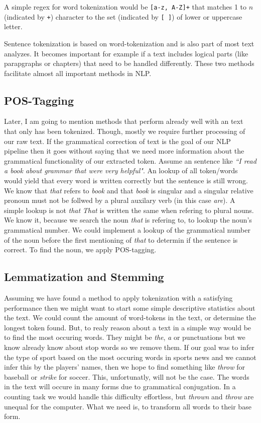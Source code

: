 A simple regex for word tokenization would be \texttt{[a-z, A-Z]+} that matches 1 to $n$ (indicated by \texttt{+}) character to the set (indicated by \texttt{[ ]}) of lower or uppercase letter.

Sentence tokenization is based on word-tokenization and is also part of most text analyzes. It becomes important for example if a text includes logical parts (like parapgraphs or chapters) that need to be handled differently.
These two methods facilitate almost all important methods in NLP.

\subsection{POS-Tagging}
Later, I am going to mention methods that perform already well with an text that only has been tokenized. Though, mostly we require further processing of our raw text. If the grammatical correction of text is the goal of our NLP pipeline then it goes without saying that we need more information about the grammatical functionality of our extracted token. Assume an sentence like \textit{``I read a book about grammar that were very helpful"}. An lookup of all token/words would yield that every word is written correctly but the sentence is still wrong. We know that \textit{that} refers to \textit{book} and that \textit{book} is singular and a singular relative pronoun must not be follwed by a plural auxilary verb (in this case \textit{are}). A simple lookup is not \textit{that} \textit{That} is written the same when refering to plural nouns. We know it, because we search the noun \textit{that} is refering to, to lookup the noun's grammatical number. We could implement a lookup of the grammatical number of the noun before the first mentioning of \textit{that} to determin if the sentence is correct. To find the noun, we apply POS-tagging.

\subsection{Lemmatization and Stemming}
Assuming we have found a method to apply tokenization with a satisfying performance then we might want to start some simple descriptive statistics about the text. We could count the amount of word-tokens in the text, or determine the longest token found. But, to realy reason about a text in a simple way would be to find the most occuring words. They might be \textit{the}, \textit{a} or punctuations but we know already know about stop words so we remove them. If our goal was to infer the type of sport based on the most occuring words in sports news and we cannot infer this by the players' names, then we hope to find something like \textit{throw} for baseball or \textit{strike} for soccer. This, unfortunatly, will not be the case. The words in the text will occure in many forms due to grammatical conjugation. In a counting task we would handle this difficulty effortless, but \textit{thrown} and \textit{throw} are unequal for the computer. What we need is, to transform all words to their base form.

